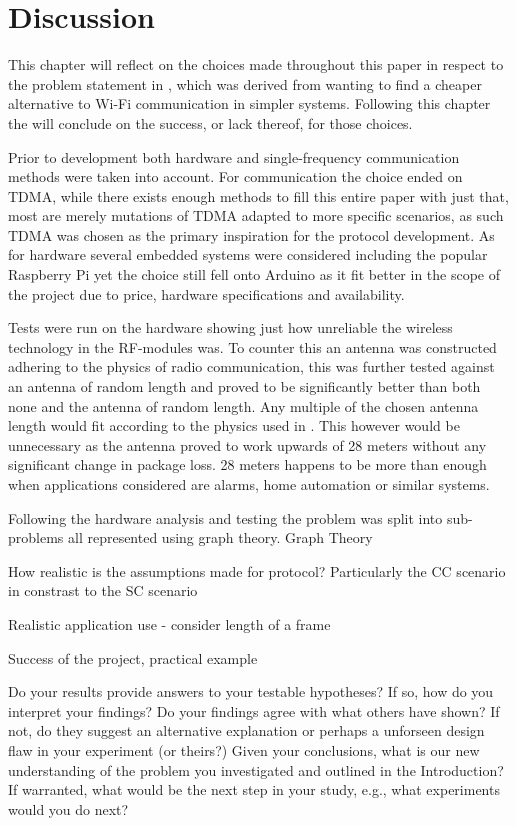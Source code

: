 \chapter{Discussion}\label{Discussion}
This chapter will reflect on the choices made throughout this paper in respect to the problem statement in , which was derived from wanting to find a cheaper alternative to Wi-Fi communication in simpler systems.
Following this chapter the  will conclude on the success, or lack thereof, for those choices.

\bigskip \noindent
Prior to development both hardware and single-frequency communication methods were taken into account.
For communication the choice ended on TDMA, while there exists enough methods to fill this entire paper with just that, most are merely mutations of TDMA adapted to more specific scenarios, as such TDMA was chosen as the primary inspiration for the protocol development.
As for hardware several embedded systems were considered including the popular Raspberry Pi yet the choice still fell onto Arduino as it fit better in the scope of the project due to price, hardware specifications and availability.

Tests were run on the hardware showing just how unreliable the wireless technology in the RF-modules was.
To counter this an antenna was constructed adhering to the physics of radio communication, this was further tested against an antenna of random length and proved to be significantly better than both none and the antenna of random length.
Any multiple of the chosen antenna length would fit according to the physics used in .
This however would be unnecessary as the antenna proved to work upwards of 28 meters without any significant change in package loss.
28 meters happens to be more than enough when applications considered are alarms, home automation or similar systems.

\bigskip \noindent
Following the hardware analysis and testing the problem was split into sub-problems all represented using graph theory.
Graph Theory


How realistic is the assumptions made for protocol? Particularly the CC scenario in constrast to the SC scenario

Realistic application use - consider length of a frame

Success of the project, practical example


Do your results provide answers to your testable hypotheses? If so, how do you interpret your findings?
Do your findings agree with what others have shown? If not, do they suggest an alternative explanation or perhaps a unforseen design flaw in your experiment (or theirs?)
Given your conclusions, what is our new understanding of the problem you investigated and outlined in the Introduction?
If warranted, what would be the next step in your study, e.g., what experiments would you do next?

